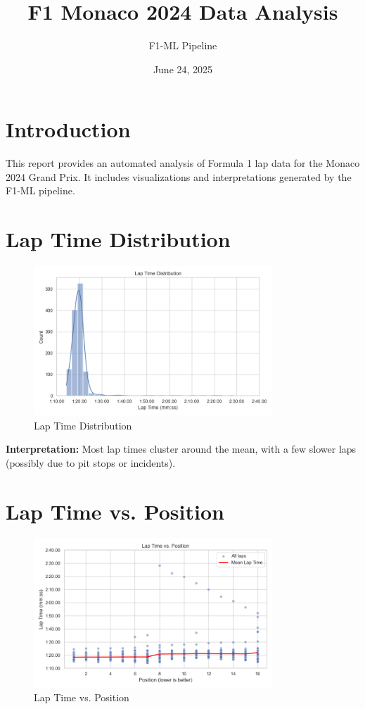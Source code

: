 \documentclass{article}
\title{F1 Monaco 2024 Data Analysis}
\author{ F1-ML Pipeline }
\date{ June 24, 2025 }
\begin{document}
\maketitle

\section*{Introduction}
This report provides an automated analysis of Formula 1 lap data for the Monaco 2024 Grand Prix. It includes visualizations and interpretations generated by the F1-ML pipeline.


\section*{ Lap Time Distribution }
\begin{figure}[h!]
    \centering
    \includegraphics[width=0.8\textwidth]{ data/processed/2024/Monaco Grand Prix/lap_time_distribution.png }
    \caption{ Lap Time Distribution }
\end{figure}

\textbf{Interpretation:} Most lap times cluster around the mean, with a few slower laps (possibly due to pit stops or incidents).


\section*{ Lap Time vs. Position }
\begin{figure}[h!]
    \centering
    \includegraphics[width=0.8\textwidth]{ data/processed/2024/Monaco Grand Prix/lap_time_vs_position.png }
    \caption{ Lap Time vs. Position }
\end{figure}
\end{document}
